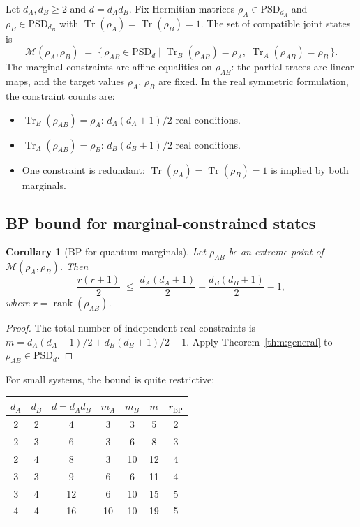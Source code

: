 \documentclass[11pt,a4paper]{article}
\newtheorem{corollary}[theorem]{Corollary}
\theoremstyle{definition}
\newcommand{\rank}{\operatorname{rank}}
\newcommand{\PSD}{\mathrm{PSD}}
\newcommand{\Tr}{\operatorname{Tr}}
\begin{document}
Let $d_A, d_B \geq 2$ and $d = d_A d_B$.  Fix Hermitian matrices
$\rho_A \in \PSD_{d_A}$ and $\rho_B \in \PSD_{d_B}$ with
$\Tr(\rho_A) = \Tr(\rho_B) = 1$.  The set of compatible joint
states is
\[
  \mathcal{M}(\rho_A, \rho_B)
  \;=\; \bigl\{\, \rho_{AB} \in \PSD_d \;\big|\;
    \Tr_B(\rho_{AB}) = \rho_A,\;
    \Tr_A(\rho_{AB}) = \rho_B \,\bigr\}.
\]
The marginal constraints are affine equalities on
$\rho_{AB}$: the partial traces are linear maps, and the target
values $\rho_A$, $\rho_B$ are fixed.  In the real symmetric
formulation, the constraint counts are:
\begin{itemize}
\item $\Tr_B(\rho_{AB}) = \rho_A$: $d_A(d_A{+}1)/2$ real conditions.
\item $\Tr_A(\rho_{AB}) = \rho_B$: $d_B(d_B{+}1)/2$ real conditions.
\item One constraint is redundant: $\Tr(\rho_A) = \Tr(\rho_B) = 1$
  is implied by both marginals.
\end{itemize}

\subsection{BP bound for marginal-constrained states}

\begin{corollary}[BP for quantum marginals]\label{cor:marginals-bp}
Let $\rho_{AB}$ be an extreme point of
$\mathcal{M}(\rho_A, \rho_B)$.  Then
\[
  \frac{r(r+1)}{2}
  \;\leq\; \frac{d_A(d_A{+}1)}{2} + \frac{d_B(d_B{+}1)}{2} - 1,
\]
where $r = \rank(\rho_{AB})$.
\end{corollary}

\begin{proof}
The total number of independent real constraints is
$m = d_A(d_A{+}1)/2 + d_B(d_B{+}1)/2 - 1$.
Apply Theorem~\ref{thm:general} to $\rho_{AB} \in \PSD_d$.
\end{proof}

For small systems, the bound is quite restrictive:

\begin{center}
\begin{tabular}{ccccccc}
\toprule
$d_A$ & $d_B$ & $d = d_A d_B$ & $m_A$ & $m_B$ & $m$ & $r_{\mathrm{BP}}$ \\
\midrule
2 & 2 &  4 & 3  & 3  &  5 & 2 \\
2 & 3 &  6 & 3  & 6  &  8 & 3 \\
2 & 4 &  8 & 3  & 10 & 12 & 4 \\
3 & 3 &  9 & 6  & 6  & 11 & 4 \\
3 & 4 & 12 & 6  & 10 & 15 & 5 \\
4 & 4 & 16 & 10 & 10 & 19 & 5 \\
\bottomrule
\end{tabular}
\end{center}
\end{document}
